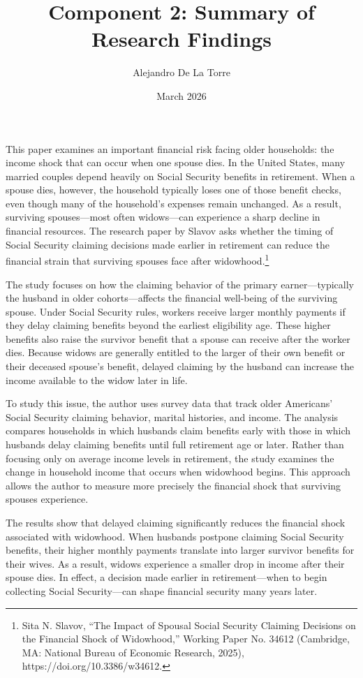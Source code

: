 \documentclass[11pt]{article}
\title{Component 2: Summary of Research Findings}
\author{Alejandro De La Torre}
\date{March 2026}
\begin{document}
\maketitle

\onehalfspacing

This paper examines an important financial risk facing older households: the income shock that can occur when one spouse dies. In the United States, many married couples depend heavily on Social Security benefits in retirement. When a spouse dies, however, the household typically loses one of those benefit checks, even though many of the household’s expenses remain unchanged. As a result, surviving spouses—most often widows—can experience a sharp decline in financial resources. The research paper by Slavov asks whether the timing of Social Security claiming decisions made earlier in retirement can reduce the financial strain that surviving spouses face after widowhood.\footnote{Sita N. Slavov, “The Impact of Spousal Social Security Claiming Decisions on the Financial Shock of Widowhood,” Working Paper No. 34612 (Cambridge, MA: National Bureau of Economic Research, 2025), https://doi.org/10.3386/w34612.}

The study focuses on how the claiming behavior of the primary earner—typically the husband in older cohorts—affects the financial well-being of the surviving spouse. Under Social Security rules, workers receive larger monthly payments if they delay claiming benefits beyond the earliest eligibility age. These higher benefits also raise the survivor benefit that a spouse can receive after the worker dies. Because widows are generally entitled to the larger of their own benefit or their deceased spouse’s benefit, delayed claiming by the husband can increase the income available to the widow later in life.

To study this issue, the author uses survey data that track older Americans’ Social Security claiming behavior, marital histories, and income. The analysis compares households in which husbands claim benefits early with those in which husbands delay claiming benefits until full retirement age or later. Rather than focusing only on average income levels in retirement, the study examines the change in household income that occurs when widowhood begins. This approach allows the author to measure more precisely the financial shock that surviving spouses experience.

The results show that delayed claiming significantly reduces the financial shock associated with widowhood. When husbands postpone claiming Social Security benefits, their higher monthly payments translate into larger survivor benefits for their wives. As a result, widows experience a smaller drop in income after their spouse dies. In effect, a decision made earlier in retirement—when to begin collecting Social Security—can shape financial security many years later.
\end{document}
